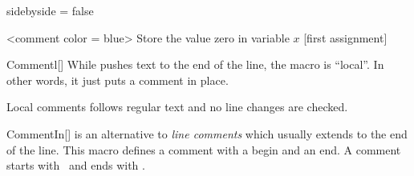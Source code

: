 \documentclass[a4paper, 11pt]{article}
\begin{document}
\begin{tcblisting}{sidebyside = false}
    \begin{minipage}{7.5cm}
        \begin{algorithmic}<comment color = blue>%
        \State Store the value zero in variable $x$
        [first assignment]%
        \end{algorithmic}
    \end{minipage}
\end{tcblisting}

\begin{macro}{Commentl}[]
    While  pushes text to the end of the line, the macro  is ``local''. In other words, it just puts a comment in place.

    Local comments follows regular text and no line changes are checked.

    \MacroOptionsText
\end{macro}

\begin{tcblisting}{}
    \begin{algorithmic}
        \EndIf
    \end{algorithmic}
\end{tcblisting}

\begin{macro}{CommentIn}[]
     is an alternative to \textit{line comments} which usually extends to the end of the line. This macro defines a comment with a begin and an end. A comment starts with \CommentSymbol\ and ends with \CommentSymbolRight.

    \MacroOptionsText
\end{macro}


\begin{tcblisting}{}
    \begin{algorithmic}
        \EndIf
    \end{algorithmic}
\end{tcblisting}
\end{document}
